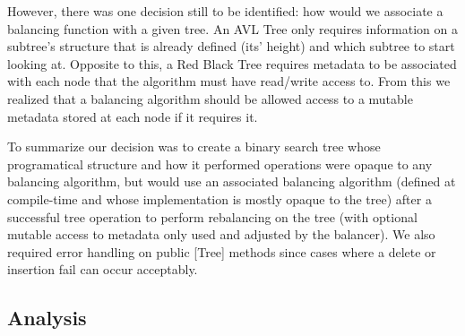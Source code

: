\documentclass[11pt, letterpaper]{article}
\begin{document}
However, there was one decision still to be identified: how would we associate a balancing function with a given tree.
An AVL Tree only requires information on a subtree's structure that is already defined (its' height) and which subtree to start looking at.
Opposite to this, a Red Black Tree requires metadata to be associated with each node that the algorithm must have read/write access to.
From this we realized that a balancing algorithm should be allowed access to a mutable metadata stored at each node if it requires it.

To summarize our decision was to create a binary search tree whose programatical structure and how it performed operations were opaque
to any balancing algorithm, but would use an associated balancing algorithm (defined at compile-time and whose implementation is mostly opaque to the tree)
after a successful tree operation to perform rebalancing on the tree (with optional mutable access to metadata only used and adjusted by the balancer).
We also required error handling on public [Tree] methods since cases where a delete or insertion fail can occur acceptably.

\subsection{Analysis}
\end{document}
